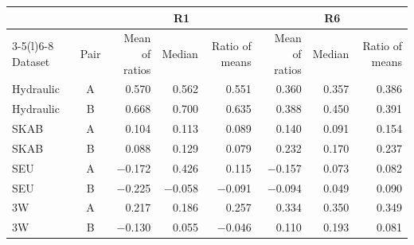 \begin{tabular}{@{}l c rrr rrr@{}}
\toprule
& & \multicolumn{3}{c}{R1} & \multicolumn{3}{c}{R6} \\
\cmidrule(lr){3-5}\cmidrule(l){6-8}
Dataset & Pair & Mean of ratios & Median & Ratio of means & Mean of ratios & Median & Ratio of means \\
\midrule
Hydraulic & A & 0.570 & 0.562 & 0.551 & 0.360 & 0.357 & 0.386 \\
Hydraulic & B & 0.668 & 0.700 & 0.635 & 0.388 & 0.450 & 0.391 \\
SKAB & A & 0.104 & 0.113 & 0.089 & 0.140 & 0.091 & 0.154 \\
SKAB & B & 0.088 & 0.129 & 0.079 & 0.232 & 0.170 & 0.237 \\
SEU & A & $-$0.172 & 0.426 & 0.115 & $-$0.157 & 0.073 & 0.082 \\
SEU & B & $-$0.225 & $-$0.058 & $-$0.091 & $-$0.094 & 0.049 & 0.090 \\
3W & A & 0.217 & 0.186 & 0.257 & 0.334 & 0.350 & 0.349 \\
3W & B & $-$0.130 & 0.055 & $-$0.046 & 0.110 & 0.193 & 0.081 \\
\bottomrule
\end{tabular}
